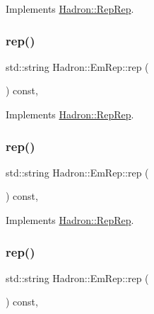 Implements \mbox{\hyperlink{structHadron_1_1RepRep_ab3213025f6de249f7095892109575fde}{Hadron\+::\+Rep\+Rep}}.

\mbox{\label{structHadron_1_1EmRep_ab85c0592fa268cf31b803c3a128bbfa5}} 
\subsubsection{\texorpdfstring{rep()}{rep()}\hspace{0.1cm}{\footnotesize\ttfamily [3/5]}}
{\footnotesize\ttfamily std\+::string Hadron\+::\+Em\+Rep\+::rep (\begin{DoxyParamCaption}{ }\end{DoxyParamCaption}) const\hspace{0.3cm}{\ttfamily [inline]}, {\ttfamily [virtual]}}



Implements \mbox{\hyperlink{structHadron_1_1RepRep_ab3213025f6de249f7095892109575fde}{Hadron\+::\+Rep\+Rep}}.

\mbox{\label{structHadron_1_1EmRep_ab85c0592fa268cf31b803c3a128bbfa5}} 
\subsubsection{\texorpdfstring{rep()}{rep()}\hspace{0.1cm}{\footnotesize\ttfamily [4/5]}}
{\footnotesize\ttfamily std\+::string Hadron\+::\+Em\+Rep\+::rep (\begin{DoxyParamCaption}{ }\end{DoxyParamCaption}) const\hspace{0.3cm}{\ttfamily [inline]}, {\ttfamily [virtual]}}



Implements \mbox{\hyperlink{structHadron_1_1RepRep_ab3213025f6de249f7095892109575fde}{Hadron\+::\+Rep\+Rep}}.

\mbox{\label{structHadron_1_1EmRep_ab85c0592fa268cf31b803c3a128bbfa5}} 
\subsubsection{\texorpdfstring{rep()}{rep()}\hspace{0.1cm}{\footnotesize\ttfamily [5/5]}}
{\footnotesize\ttfamily std\+::string Hadron\+::\+Em\+Rep\+::rep (\begin{DoxyParamCaption}{ }\end{DoxyParamCaption}) const\hspace{0.3cm}{\ttfamily [inline]}, {\ttfamily [virtual]}}



